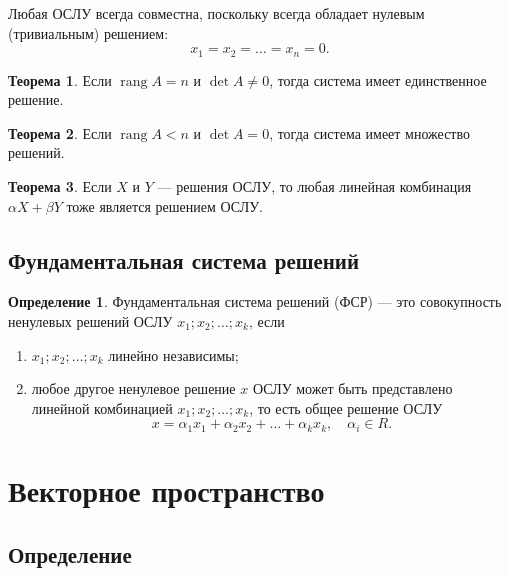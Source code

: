 \documentclass[a5paper, 11pt]{extbook}
\theoremstyle{definition}
\newtheorem{theorem}{Теорема}[chapter]
\theoremstyle{definition}
\newtheorem{definition}{Определение}[chapter]
\DeclareMathOperator{\rang}{rang}
\begin{document}
Любая ОСЛУ всегда совместна, поскольку всегда обладает нулевым (тривиальным) решением:
\begin{equation*}
    x_1 = x_2 = \ldots = x_n = 0.
\end{equation*}

\begin{theorem}
    Если \(\rang A = n\) и \(\det A \neq 0\), тогда система имеет единственное решение.
\end{theorem}

\begin{theorem}
    Если \(\rang A < n\) и \(\det A = 0\), тогда система имеет множество решений.
\end{theorem}

\begin{theorem}
    Если \(X\) и \(Y\) — решения ОСЛУ, то любая линейная комбинация \(\alpha X + \beta Y\) тоже является решением ОСЛУ.
\end{theorem}

\section{Фундаментальная система решений}

\begin{definition}
    Фундаментальная система решений (ФСР) — это совокупность ненулевых решений ОСЛУ \(x_1; x_2; \ldots; x_k\), если
    \begin{enumerate}
        \item \(x_1; x_2; \ldots; x_k\) линейно независимы;
        \item любое другое ненулевое решение \(x\) ОСЛУ может быть представлено линейной комбинацией \(x_1; x_2; \ldots; x_k\), то есть общее решение ОСЛУ
              \begin{equation*}
                  x = \alpha_1 x_1 + \alpha_2 x_2 + \ldots + \alpha_k x_k,
                  \quad
                  \alpha_i \in R.
              \end{equation*}
    \end{enumerate}
\end{definition}

\chapter{Векторное пространство}

\section{Определение}
\end{document}

